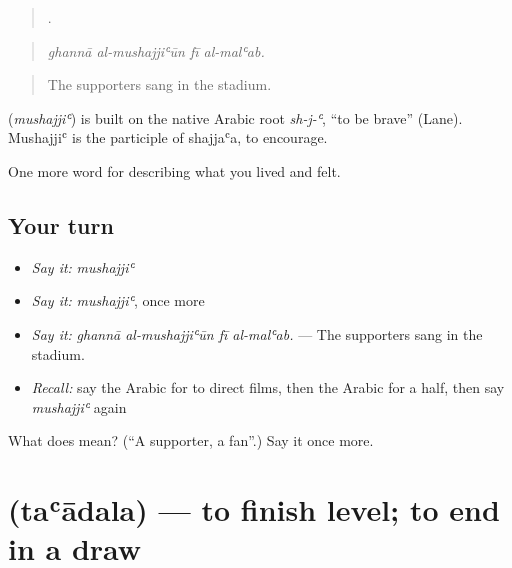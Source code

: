 \begin{quote}
   .
\end{quote}

\begin{quote}
\emph{ghannā al-mushajjiʿūn fī al-malʿab.}
\end{quote}

\begin{quote}
The supporters sang in the stadium.
\end{quote}

\begin{cousinweb}
\textbf{} (\emph{mushajjiʿ}) is built on the native Arabic root \emph{sh-j-ʿ}, \textquotedblleft{}to be brave\textquotedblright{} (Lane). Mushajjiʿ is the participle of shajjaʿa, to encourage.
\end{cousinweb}

\begin{grammarlens}[title={What you've built}]
One more word for describing what you lived and felt.
\end{grammarlens}

\subsection*{Your turn}
\begin{itemize}
\raggedright
  \item \emph{Say it:} \emph{mushajjiʿ}
  \item \emph{Say it:} \emph{mushajjiʿ}, once more
  \item \emph{Say it:} \emph{ghannā al-mushajjiʿūn fī al-malʿab.} — The supporters sang in the stadium.
  \item \emph{Recall:} say the Arabic for to direct films, then the Arabic for a half, then say \emph{mushajjiʿ} again
\end{itemize}

\begin{tcolorbox}[breakable,colback=teal!4,colframe=teal!35!black,title={Before you move on}]
What does  mean? (\textquotedblleft{}A supporter, a fan\textquotedblright{}.) Say it once more.
\end{tcolorbox}
\section[\texorpdfstring{\ar{تعادل} (taʿādala)}{تعادل (taʿādala)}]{ (taʿādala) — to finish level; to end in a draw}

